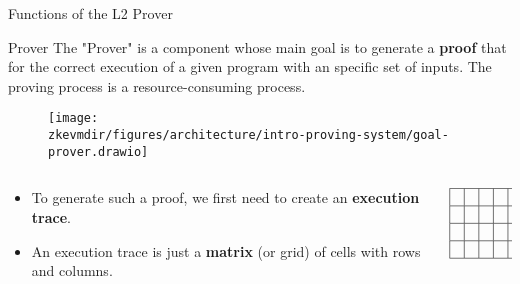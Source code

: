 \begin{frame} {Functions of the L2 Prover}
\begin{block}{Prover}
The "Prover" is a component whose main goal is to generate a \textbf{proof} that for the correct execution of a given program with an specific set of inputs. The proving process is a resource-consuming process.
\end{block}

\begin{figure}
\texttt{[image: \\zkevmdir/figures/architecture/intro-proving-system/goal-prover.drawio]}
\end{figure}

\begin{columns}
\begin{column}{0.7\textwidth}
\begin{itemize}
\item To generate such a proof, we first need to create an \textbf{execution trace}.
\item An execution trace is just a \textbf{matrix} (or grid) of cells with rows and columns.
\end{itemize}
\end{column}
\begin{column}{0.3\textwidth}
$$
\begin{array}{|c|c|c|c|c|}
\hline
 &  & & & \\ \hline
 &  & & &\\ \hline
 &  & & &\\ \hline
 &  & & &\\ \hline
\end{array}
$$
\end{column}
\end{columns}
\end{frame}




